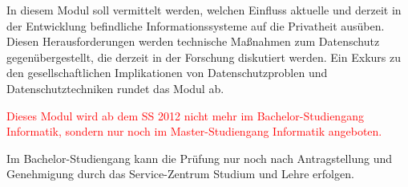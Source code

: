 \begin{module}
\begin{learningoutcomes}
\end{learningoutcomes}

\begin{content}
In diesem Modul soll vermittelt werden, welchen Einfluss aktuelle und derzeit in der Entwicklung befindliche Informationssysteme auf die Privatheit ausüben. Diesen Herausforderungen werden technische Maßnahmen zum Datenschutz gegenübergestellt, die derzeit in der Forschung diskutiert werden. Ein Exkurs zu den gesellschaftlichen Implikationen von Datenschutzproblen und Datenschutztechniken rundet das Modul ab.


\end{content}

\begin{remarks}\textcolor{red}{Dieses Modul wird ab dem SS 2012 nicht mehr im Bachelor-Studiengang Informatik, sondern nur noch im Master-Studiengang Informatik angeboten.}

 

Im Bachelor-Studiengang kann die Prüfung nur noch nach Antragstellung und Genehmigung durch das Service-Zentrum Studium und Lehre erfolgen.

\end{remarks}

\end{module}

